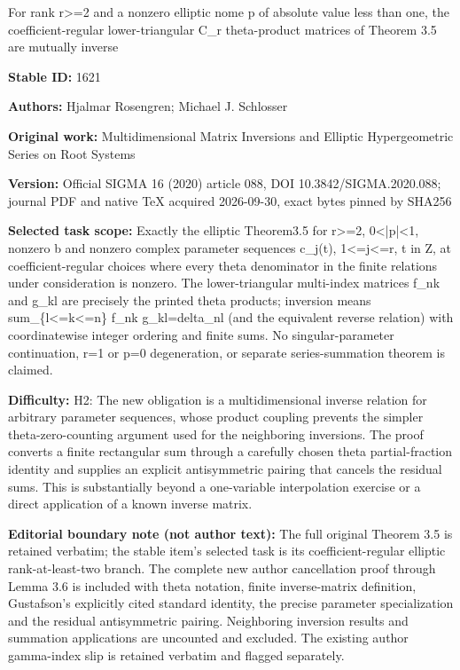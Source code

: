 \documentclass[11pt]{article}
\numberwithin{equation}{section}
\begin{document}
\begin{center}\Large For rank r>=2 and a nonzero elliptic nome p of absolute value less than one, the coefficient-regular lower-triangular C\_r theta-product matrices of Theorem 3.5 are mutually inverse\end{center}
\noindent\textbf{Stable ID:} 1621\par
\noindent\textbf{Authors:} Hjalmar Rosengren; Michael J. Schlosser\par
\noindent\textbf{Original work:} Multidimensional Matrix Inversions and Elliptic Hypergeometric Series on Root Systems\par
\noindent\textbf{Version:} Official SIGMA 16 (2020) article 088, DOI 10.3842/SIGMA.2020.088; journal PDF and native TeX acquired 2026-09-30, exact bytes pinned by SHA256\par
\noindent\textbf{Selected task scope:} Exactly the elliptic Theorem3.5 for r>=2, 0<|p|<1, nonzero b and nonzero complex parameter sequences c\_j(t), 1<=j<=r, t in Z, at coefficient-regular choices where every theta denominator in the finite relations under consideration is nonzero. The lower-triangular multi-index matrices f\_nk and g\_kl are precisely the printed theta products; inversion means sum\_\{l<=k<=n\} f\_nk g\_kl=delta\_nl (and the equivalent reverse relation) with coordinatewise integer ordering and finite sums. No singular-parameter continuation, r=1 or p=0 degeneration, or separate series-summation theorem is claimed.\par
\noindent\textbf{Difficulty:} H2: The new obligation is a multidimensional inverse relation for arbitrary parameter sequences, whose product coupling prevents the simpler theta-zero-counting argument used for the neighboring inversions. The proof converts a finite rectangular sum through a carefully chosen theta partial-fraction identity and supplies an explicit antisymmetric pairing that cancels the residual sums. This is substantially beyond a one-variable interpolation exercise or a direct application of a known inverse matrix.\par
\noindent\textbf{Editorial boundary note (not author text):} The full original Theorem 3.5 is retained verbatim; the stable item's selected task is its coefficient-regular elliptic rank-at-least-two branch. The complete new author cancellation proof through Lemma 3.6 is included with theta notation, finite inverse-matrix definition, Gustafson's explicitly cited standard identity, the precise parameter specialization and the residual antisymmetric pairing. Neighboring inversion results and summation applications are uncounted and excluded. The existing author gamma-index slip is retained verbatim and flagged separately.\par
\end{document}
